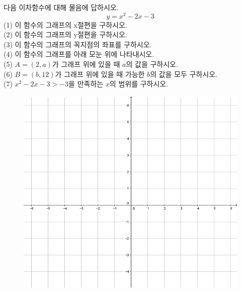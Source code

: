 \documentclass{article}
\newcommand\bp[1]{\begin{mdframed}[frametitle={#1},skipabove=10pt,skipbelow=20pt,innertopmargin=5pt,innerbottommargin=40pt]}
\newcommand\ep{\end{mdframed}\par}
\newcommand{\vvs}{\vspace{0.1\textheight}}
\begin{document}
\bp{04}
다음 이차함수에 대해 물음에 답하시오.
\[y=x^2-2x-3\]
(1) 이 함수의 그래프의 x절편을 구하시오.\\
(2) 이 함수의 그래프의 y절편을 구하시오.\\
(3) 이 함수의 그래프의 꼭지점의 좌표를 구하시오.\\
(4) 이 함수의 그래프를 아래 모눈 위에 나타내시오.\\
(5) \(A=(2,a)\)가 그래프 위에 있을 때 \(a\)의 값을 구하시오.\\
(6) \(B=(b,12)\)가 그래프 위에 있을 때 가능한 \(b\)의 값을 모두 구하시오.\\
(7) \(x^2-2x-3>-3\)을 만족하는 \(x\)의 범위를 구하시오.
\vvs\ep
\begin{figure}[h!]
\centering
\includegraphics[width=.7\textwidth]{grid}
\end{figure}
\end{document}
